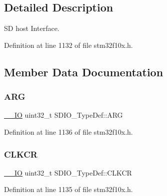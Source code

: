 \subsection{Detailed Description}
SD host Interface. 

Definition at line 1132 of file stm32f10x.\+h.



\subsection{Member Data Documentation}
\mbox{\label{struct_s_d_i_o___type_def_a3e24392875e98cd09043e54a0990ab7a}} 
\subsubsection{\texorpdfstring{A\+RG}{ARG}}
{\footnotesize\ttfamily \hyperlink{core__sc300_8h_aec43007d9998a0a0e01faede4133d6be}{\+\_\+\+\_\+\+IO} uint32\+\_\+t S\+D\+I\+O\+\_\+\+Type\+Def\+::\+A\+RG}



Definition at line 1136 of file stm32f10x.\+h.

\mbox{\label{struct_s_d_i_o___type_def_aeb1e30ce2038628e45264f75e5e926bb}} 
\subsubsection{\texorpdfstring{C\+L\+K\+CR}{CLKCR}}
{\footnotesize\ttfamily \hyperlink{core__sc300_8h_aec43007d9998a0a0e01faede4133d6be}{\+\_\+\+\_\+\+IO} uint32\+\_\+t S\+D\+I\+O\+\_\+\+Type\+Def\+::\+C\+L\+K\+CR}



Definition at line 1135 of file stm32f10x.\+h.

\mbox{\label{struct_s_d_i_o___type_def_abbbdc3174e12dab21123d746d65f345d}} 

